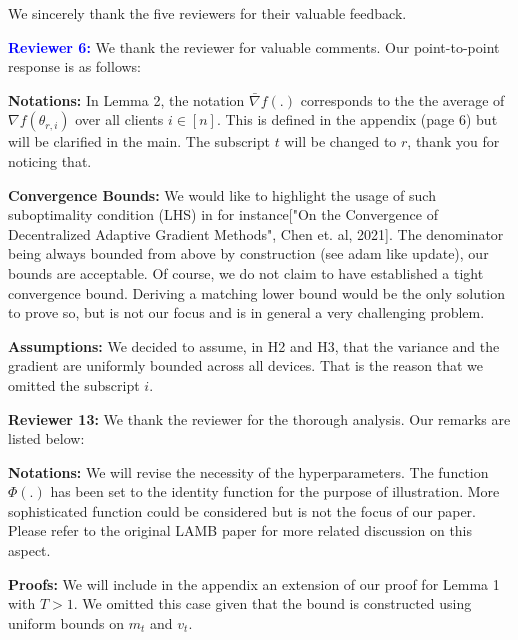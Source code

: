 \documentclass{article}
\begin{document}
We sincerely thank the five reviewers for their valuable feedback.


\vspace{0.01in}

\textbf{\textcolor{blue}{Reviewer 6:}} We thank the reviewer for valuable comments. Our point-to-point response is as follows:\vspace{-5pt}

\textbf{Notations:} In Lemma 2, the notation $\bar{\nabla} f(.)$ corresponds to the the average of $\nabla f(\theta_{r,i})$ over all clients $i \in [n]$. This is defined in the appendix (page 6) but will be clarified in the main.
The subscript $t$ will be changed to $r$, thank you for noticing that.

\textbf{Convergence Bounds:} 
We would like to highlight the usage of such suboptimality condition (LHS) in for instance["On the Convergence of Decentralized Adaptive Gradient Methods", Chen et. al, 2021]. The denominator being always bounded from above by construction (see adam like update), our bounds are acceptable. Of course, we do not claim to have established a tight convergence bound. Deriving a matching lower bound would be the only solution to prove so, but is not our focus and is in general a very challenging problem.


\textbf{Assumptions:} 
We decided to assume, in H2 and H3, that the variance and the gradient are uniformly bounded across all devices.
That is the reason that we omitted the subscript $i$.


\vspace{0.01in}





\vspace{0.01in}
\textbf{\textcolor{green!50!black}{Reviewer 13:}} We thank the reviewer for the thorough analysis. Our remarks are listed below:\vspace{-5pt}

\textbf{Notations:} 
We will revise the necessity of the hyperparameters.
The function $\Phi(.)$ has been set to the identity function for the purpose of illustration. More sophisticated function could be considered but is not the focus of our paper. Please refer to the original LAMB paper for more related discussion on this aspect.

\textbf{Proofs:} We will include in the appendix an extension of our proof for Lemma 1 with $T > 1$. We omitted this case given that the bound is constructed using uniform bounds on $m_t$ and $v_t$.
\end{document}

